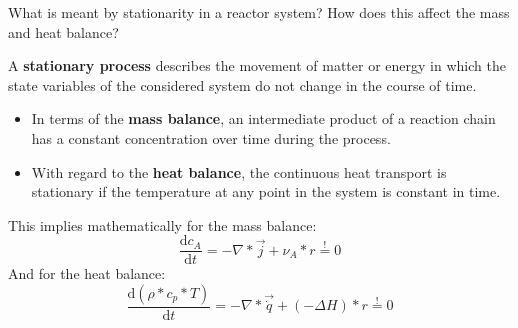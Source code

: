 
\begin{question}
What is meant by stationarity in a reactor system? How does this affect the mass and heat balance?
\end{question}

\begin{solution}
A \textbf{stationary process} describes the movement of matter or energy in which the state variables of the considered system do not change in the course of time.
\begin{itemize}
 \item In terms of the \textbf{mass balance}, an intermediate product of a reaction chain has a constant concentration over time during the process.
 \item With regard to the \textbf{heat balance}, the continuous heat transport is stationary if the temperature at any point in the system is constant in time.
\end{itemize}
This implies mathematically for the mass balance:
\begin{equation}
 \frac{\mathrm{d}c_A}{\mathrm{d}t} = - \nabla * \vec{j} + \nu_A * r \overset{!}{=} 0
\end{equation}
And for the heat balance:
\begin{equation}
 \frac{\mathrm{d}(\rho * c_p * T)}{\mathrm{d}t} =  - \nabla * \vec{\dot{q}} + (-\Delta H)* r \overset{!}{=} 0 
\end{equation}
\end{solution}

